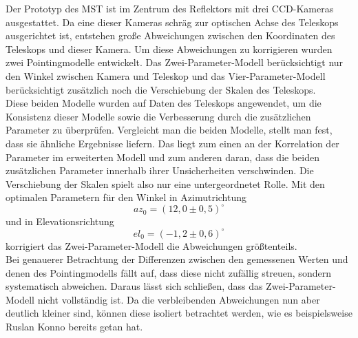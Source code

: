 Der Prototyp des MST ist im Zentrum des Reflektors mit drei CCD-Kameras ausgestattet. Da eine dieser Kameras schräg zur optischen Achse des Teleskops ausgerichtet ist, entstehen große Abweichungen zwischen den Koordinaten des Teleskops und dieser Kamera. Um diese Abweichungen zu korrigieren wurden zwei Pointingmodelle entwickelt. Das Zwei-Parameter-Modell berücksichtigt nur den Winkel zwischen Kamera und Teleskop und das Vier-Parameter-Modell berücksichtigt zusätzlich noch die Verschiebung der Skalen des Teleskops.\\
Diese beiden Modelle wurden auf Daten des Teleskops angewendet, um die Konsistenz dieser Modelle sowie die Verbesserung durch die zusätzlichen Parameter zu überprüfen. Vergleicht man die beiden Modelle, stellt man fest, dass sie ähnliche Ergebnisse liefern. Das liegt zum einen an der Korrelation der Parameter im erweiterten Modell und zum anderen daran, dass die beiden zusätzlichen Parameter innerhalb ihrer Unsicherheiten verschwinden. Die Verschiebung der Skalen spielt also nur eine untergeordnetet Rolle. Mit den optimalen Parametern für den Winkel in Azimutrichtung $$az_0=(12,0\pm0,5)^{\circ}$$ und in Elevationsrichtung $$el_0=(-1,2\pm0,6)^{\circ}$$ korrigiert das Zwei-Parameter-Modell die Abweichungen größtenteils.\\
Bei genauerer Betrachtung der Differenzen zwischen den gemessenen Werten und denen des Pointingmodells fällt auf, dass diese nicht zufällig streuen, sondern systematisch abweichen. Daraus lässt sich schließen, dass das Zwei-Parameter-Modell nicht vollständig ist. Da die verbleibenden Abweichungen nun aber deutlich kleiner sind, können diese isoliert betrachtet werden, wie es beispielsweise Ruslan Konno \cite{Ruslan} bereits getan hat.
